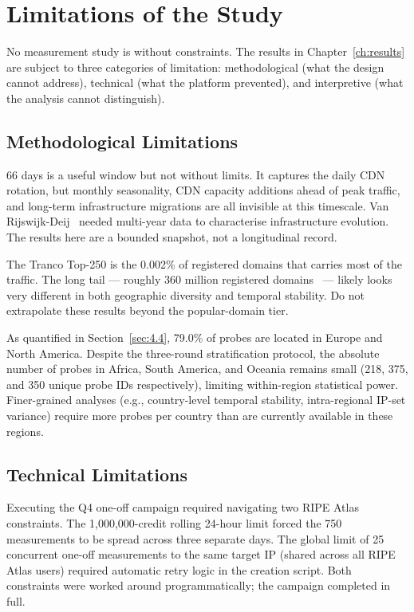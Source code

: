 \bigskip
\section{Limitations of the Study}
\label{sec:5.2}

No measurement study is without constraints. The results in Chapter~\ref{ch:results} are subject to three categories of limitation: methodological (what the design cannot address), technical (what the platform prevented), and interpretive (what the analysis cannot distinguish).

\bigskip
\subsection{Methodological Limitations}
\label{subsec:5.2.1}

66 days is a useful window but not without limits. It captures the daily \ac{CDN} rotation, but monthly seasonality, \ac{CDN} capacity additions ahead of peak traffic, and long-term infrastructure migrations are all invisible at this timescale. Van Rijswijk-Deij~\cite{vanRijswijk2016} needed multi-year data to characterise infrastructure evolution. The results here are a bounded snapshot, not a longitudinal record.

The Tranco Top-250 is the 0.002\% of registered domains that carries most of the traffic. The long tail --- roughly 360 million registered domains~\cite{vanRijswijk2016} --- likely looks very different in both geographic diversity and temporal stability. Do not extrapolate these results beyond the popular-domain tier.

As quantified in Section~\ref{sec:4.4}, 79.0\% of probes are located in Europe and North America. Despite the three-round stratification protocol, the absolute number of probes in Africa, South America, and Oceania remains small (218, 375, and 350 unique probe IDs respectively), limiting within-region statistical power. Finer-grained analyses (e.g., country-level temporal stability, intra-regional \ac{IP}-set variance) require more probes per country than are currently available in these regions.

\bigskip
\subsection{Technical Limitations}
\label{subsec:5.2.2}

Executing the Q4 one-off campaign required navigating two RIPE Atlas constraints. The 1,000,000-credit rolling 24-hour limit forced the 750 measurements to be spread across three separate days. The global limit of 25 concurrent one-off measurements to the same target \ac{IP} (shared across all RIPE Atlas users) required automatic retry logic in the creation script. Both constraints were worked around programmatically; the campaign completed in full.

